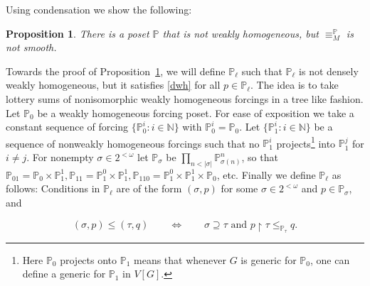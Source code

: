 \documentclass{amsart}
\newtheorem{proposition}[theorem]{Proposition}
\theoremstyle{definition}
\theoremstyle{remark}
\begin{document}
Using condensation we show the following:
\begin{proposition}
\label{prop : weakly homogeneous}
There is a poset $\mathbb{P}$ that is not weakly homogeneous,  but \(\equiv_{M}^\mathbb{P}\) is not smooth.
\end{proposition}








Towards the proof of Proposition~\ref{prop : weakly homogeneous}, we will define \(\mathbb{P}_\ell\) such that  \(\mathbb{P}_\ell\) is not densely weakly homogeneous,  but it satisfies \eqref{dwh} for all \(p\in\mathbb{P}_\ell\).
The idea is to take lottery sums of nonisomorphic weakly homogeneous forcings in a tree like fashion. 
 Let $\mathbb{P}_0$ be a weakly homogeneous forcing poset. For ease of exposition we take a constant sequence of forcing \(\{\mathbb{P}^i_0: i\in \mathbb{N}\}\) with \(\mathbb{P}^i_0 = \mathbb{P}_0\). Let \(\{\mathbb{P}_1^i:i\in\mathbb{N}\}\) be a sequence of nonweakly homogeneous forcings such that no \(\mathbb{P}^i_1\) projects\footnote{Here \(\mathbb{P}_0\) projects onto \(\mathbb{P}_1\) means that whenever \(G\) is generic for \(\mathbb{P}_0\), one can define a generic for \(\mathbb{P}_1\) in \(V[G]\).} into \(\mathbb{P}^j_1\) for \(i\neq j\).
For nonempty \(\sigma\in 2^{<\omega}\) let \(\mathbb{P}_\sigma\) be \(\prod_{n<|\sigma|}\mathbb{P}^n_{\sigma(n)}\), so that $\mathbb{P}_{01}=\mathbb{P}_0\times\mathbb{P}^1_1, \mathbb{P}_{11}=\mathbb{P}^0_1\times\mathbb{P}^1_1,\mathbb{P}_{110}=\mathbb{P}^0_1\times\mathbb{P}^1_1\times\mathbb{P}_0$, etc.  Finally we define \(\mathbb{P}_\ell\) as follows:
Conditions in $\mathbb{P}_\ell$ are of the form $(\sigma, p)$ for some $\sigma\in 2^{<\omega}$ and \(p\in \mathbb{P}_\sigma\), and

\[(\sigma, p)\leq (\tau,q)\qquad\iff\qquad\sigma \supseteq \tau\text{ and } {p\restriction \tau} \leq_{\mathbb{P}_\tau} q.\]
\end{document}
